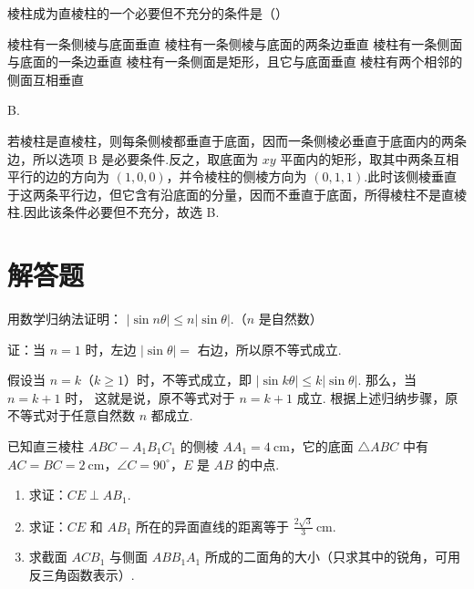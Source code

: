 \documentclass[UTF8,a4paper,oneside,11pt]{ctexbook}
\begin{document}
\begin{problem}

棱柱成为直棱柱的一个必要但不充分的条件是（\quad）

\choicesfive
    {棱柱有一条侧棱与底面垂直}
    {棱柱有一条侧棱与底面的两条边垂直}
    {棱柱有一条侧面与底面的一条边垂直}
    {棱柱有一条侧面是矩形，且它与底面垂直}
    {棱柱有两个相邻的侧面互相垂直}
\end{problem}

\begin{answer}
B.
\end{answer}

\begin{solution}
若棱柱是直棱柱，则每条侧棱都垂直于底面，因而一条侧棱必垂直于底面内的两条边，所以选项 B 是必要条件.反之，取底面为 \(xy\) 平面内的矩形，取其中两条互相平行的边的方向为 \((1,0,0)\)，并令棱柱的侧棱方向为 \((0,1,1)\).此时该侧棱垂直于这两条平行边，但它含有沿底面的分量，因而不垂直于底面，所得棱柱不是直棱柱.因此该条件必要但不充分，故选 B.
\end{solution}

\section{解答题}

\begin{problem}

用数学归纳法证明： \(|\sin n\theta| \leqslant n|\sin\theta| \).（\(n\) 是自然数）
\end{problem}

\begin{solution}
证：当 \(n=1\) 时，左边 \(|\sin\theta|=\) 右边，所以原不等式成立.

假设当 \(n = k\)（\(k \geq 1\)）时，不等式成立，即
\(\left|\sin k\theta\right|\leqslant k\left|\sin\theta\right|\).
那么，当 \(n=k+1\) 时，
这就是说，原不等式对于 \(n = k + 1\) 成立. 根据上述归纳步骤，原不等式对于任意自然数 \(n\) 都成立.
\end{solution}

\begin{problem}

已知直三棱柱 \(ABC-A_1B_1C_1 \) 的侧棱 \(AA_1=4\mathrm{~cm} \)，它的底面 \(\triangle ABC \) 中有 \(AC=BC=2\mathrm{~cm} \)，\(\angle C=90^\circ \)，\(E\) 是 \(AB\) 的中点.

\begin{enumerate}
\item 求证：\(CE \perp AB_{1}\).
\item 求证：\(CE\) 和 \(AB_{1}\) 所在的异面直线的距离等于 \(\frac{2\sqrt{3}}{3}\mathrm{~cm}\).
\item 求截面 \(ACB_{1}\) 与侧面 \(ABB_{1}A_{1}\) 所成的二面角的大小（只求其中的锐角，可用反三角函数表示）.
\end{enumerate}
\end{problem}
\end{document}
